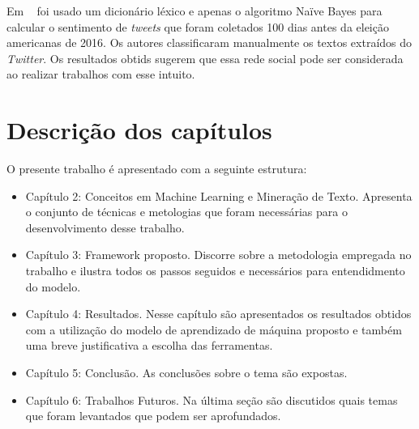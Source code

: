 

Em ~\cite{joyce} foi usado um dicionário léxico e apenas o algoritmo Naïve Bayes para calcular o sentimento de \textit{tweets} que foram coletados 100 dias antes da eleição americanas
de 2016. Os autores classificaram manualmente os textos extraídos do \textit{Twitter}. Os resultados obtids sugerem que essa rede social pode ser considerada ao realizar 
trabalhos com esse intuito.


\section{Descrição dos capítulos}

O presente trabalho é apresentado com a seguinte estrutura:

\begin{itemize}
	\item Capítulo 2: Conceitos em Machine Learning e Mineração de Texto. Apresenta o conjunto de técnicas
	      e metologias que foram necessárias para o desenvolvimento desse trabalho.
	\item Capítulo 3: Framework proposto. Discorre sobre a metodologia empregada no trabalho e ilustra todos os passos
	      seguidos e necessários para entendidmento do modelo.
	\item Capítulo 4: Resultados. Nesse capítulo são apresentados os resultados obtidos com a utilização do modelo de aprendizado 
	      de máquina proposto e também uma breve justificativa a escolha das ferramentas.
	\item Capítulo 5: Conclusão. As conclusões sobre o tema são expostas.
	\item Capítulo 6: Trabalhos Futuros. Na última seção são discutidos quais temas que foram levantados que podem ser aprofundados.
\end{itemize}